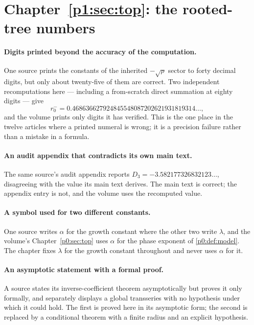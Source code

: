 \documentclass[11pt,a4paper,oneside]{book}
\theoremstyle{plain}
\theoremstyle{definition}
\theoremstyle{remark}
\begin{document}
\section{Chapter~\ref{p1:sec:top}: the rooted-tree numbers}

\paragraph{Digits printed beyond the accuracy of the computation.}
One source prints the constants of the inherited \(-\sqrt\rho\) sector to
forty decimal digits, but only about twenty-five of them are correct.  Two
independent recomputations here --- including a from-scratch direct summation
at eighty digits --- give
\[
  r_0^{-}=0.468636627924845548087202621931819314\ldots,
\]
and the volume prints only digits it has verified.  This is the one place in
the twelve articles where a printed numeral is wrong; it is a precision
failure rather than a mistake in a formula.

\paragraph{An audit appendix that contradicts its own main text.}
The same source's audit appendix reports \(D_3=-3.582177326832123\ldots\),
disagreeing with the value its main text derives.  The main text is correct;
the appendix entry is not, and the volume uses the recomputed value.

\paragraph{A symbol used for two different constants.}
One source writes \(\alpha\) for the growth constant where the other two write
\(\lambda\), and the volume's Chapter~\ref{p0:sec:top} uses \(\alpha\) for the
phase exponent of \cref{p0:def:model}.  The chapter fixes \(\lambda\) for the
growth constant throughout and never uses \(\alpha\) for it.

\paragraph{An asymptotic statement with a formal proof.}
A source states its inverse-coefficient theorem asymptotically but proves it
only formally, and separately displays a global transseries with no hypothesis
under which it could hold.  The first is proved here in its asymptotic form;
the second is replaced by a conditional theorem with a finite radius and an
explicit hypothesis.
\end{document}
